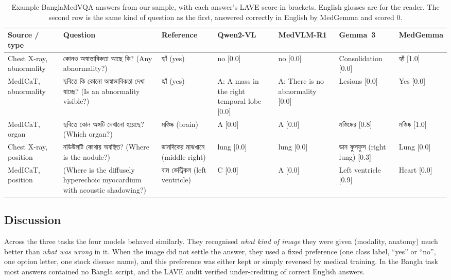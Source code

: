 \documentclass[doublecolumn]{ijcvsplatex}
\newcommand{\bn}[1]{{\bengalifont #1}}
\newcommand{\bn}[1]{\textit{[Bangla]}}
\newcommand{\qwen}{Qwen2-VL}
\newcommand{\medvlm}{MedVLM-R1}
\newcommand{\gemma}{Gemma~3}
\newcommand{\medgemma}{MedGemma}
\begin{document}
\begin{table}[tb]
\centering
\caption{Example BanglaMedVQA answers from our sample, with each answer's LAVE score in brackets. English glosses are for the reader. The second row is the same kind of question as the first, answered correctly in English by \medgemma{} and scored 0.}
\label{tab_examples}
\footnotesize
\setlength{\tabcolsep}{3pt}
\begin{tabular}{@{}p{1.9cm}p{3.6cm}p{2.3cm}p{2.1cm}p{2.1cm}p{2.3cm}p{2.1cm}@{}}
\toprule
\textbf{Source / type} & \textbf{Question} & \textbf{Reference} & \textbf{\qwen{}} & \textbf{\medvlm{}} & \textbf{\gemma{}} & \textbf{\medgemma{}} \\
\midrule
Chest X-ray, abnormality & \bn{কোনও অস্বাভাবিকতা আছে কি?} (Any abnormality?) & \bn{হ্যাঁ} (yes) & no [0.0] & no [0.0] & Consolidation [0.0] & \bn{হ্যাঁ} [1.0] \\
MedICaT, \newline abnormality & \bn{ছবিতে কি কোনো অস্বাভাবিকতা দেখা যাচ্ছে?} (Is an abnormality visible?) & \bn{হ্যাঁ} (yes) & A: A mass in the right temporal lobe [0.0] & A: There is no abnormality [0.0] & Lesions [0.0] & Yes [0.0] \\
MedICaT, organ & \bn{ছবিতে কোন অঙ্গটি দেখানো হয়েছে?} (Which organ?) & \bn{মস্তিষ্ক} (brain) & A [0.0] & A [0.0] & \bn{মস্তিষ্কের} [0.8] & \bn{মস্তিষ্ক} [1.0] \\
Chest X-ray, position & \bn{নডিউলটি কোথায় অবস্থিত?} (Where is the nodule?) & \bn{ডানদিকের মাঝখানে} (middle right) & lung [0.0] & lung [0.0] & \bn{ডান ফুসফুস} (right lung) [0.3] & Lung [0.0] \\
MedICaT, \newline position & (Where is the diffusely hyperechoic myocardium with acoustic shadowing?) & \bn{বাম ভেন্ট্রিকল} (left ventricle) & C [0.0] & A [0.0] & Left ventricle [0.9] & Heart [0.0] \\
\bottomrule
\end{tabular}
\end{table}

\subsection{Discussion}
Across the three tasks the four models behaved similarly. They recognised \emph{what kind of image} they were given (modality, anatomy) much better than \emph{what was wrong} in it. When the image did not settle the answer, they used a fixed preference (one class label, ``yes'' or ``no'', one option letter, one stock disease name), and this preference was either kept or simply reversed by medical training. In the Bangla task most answers contained no Bangla script, and the LAVE audit verified under-crediting of correct English answers.
\end{document}
